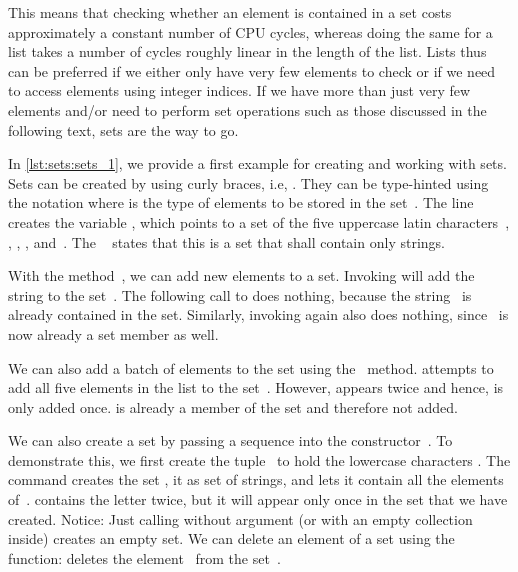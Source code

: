 This means that checking whether an element is contained in a set costs approximately a constant number of CPU cycles, whereas doing the same for a list takes a number of cycles roughly linear in the length of the list.
Lists thus can be preferred if we either only have very few elements to check or if we need to access elements using integer indices.
If we have more than just very few elements and/or need to perform set operations such as those discussed in the following text, sets are the way to go.%
%
\begin{sloppypar}%
In \cref{lst:sets:sets_1}, we provide a first example for creating and working with sets.
Sets can be created by using curly braces, i.e, .
They can be type-hinted using the notation  where  is the type of elements to be stored in the set~\cite{PEP585}.
The line  creates the variable , which points to a set of the five uppercase latin characters~, , , , and~.
The ~ states that this is a set that shall contain only strings.%
\end{sloppypar}%
%
With the method~, we can add new elements to a set.
Invoking  will add the string  to the set~.
The following call to  does nothing, because the string~ is already contained in the set.
Similarly, invoking  again also does nothing, since~ is now already a set member as well.%
%
\begin{sloppypar}%
We can also add a batch of elements to the set using the ~method.
 attempts to add all five elements in the list \pythonil{["K", "G", "W", "Q", "W"]} to the set~.
However,  appears twice and hence, is only added once.
 is already a member of the set and therefore not added.%
\end{sloppypar}%
%
We can also create a set by passing a sequence into the constructor~.
To demonstrate this, we first create the tuple~ to hold the lowercase characters .
The command  creates the set ,  it as set of strings, and lets it contain all the elements of~.
 contains the letter  twice, but it will appear only once in the set that we have created.
Notice: Just calling  without argument (or with an empty collection inside) creates an empty set.
We can delete an element of a set using the  function:
 deletes the element~ from the set~.

